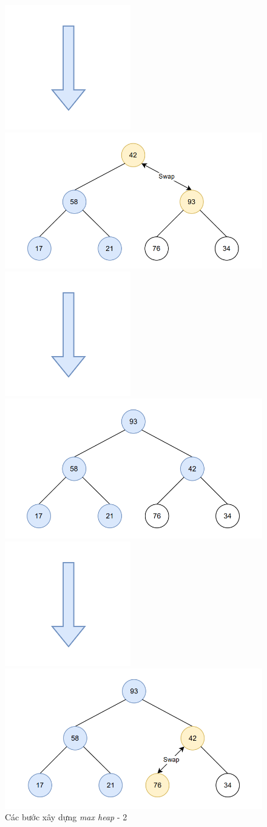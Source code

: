 \begin{figure}[H]
    \centering
    \includegraphics[width=0.1\linewidth]{img/heap_sort/arrow.png}
    \vspace{0.01cm}

    \includegraphics[width=0.5\linewidth]{img/heap_sort/4.png}
    \vspace{0.01cm}

    \includegraphics[width=0.1\linewidth]{img/heap_sort/arrow.png}
    \vspace{0.01cm}
    
    \includegraphics[width=0.5\linewidth]{img/heap_sort/5.png}
    \vspace{0.01cm}

    \includegraphics[width=0.1\linewidth]{img/heap_sort/arrow.png}
    \vspace{0.01cm}

    \includegraphics[width=0.5\linewidth]{img/heap_sort/6.png}

    \caption{Các bước xây dựng \textit{max heap} - 2}
\end{figure}

